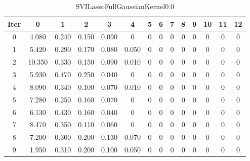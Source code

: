\begin{table}
	\begin{center}
		\begin{tabular}{|c|c|c|c|c|c|c|c|c|c|c|c|c|c|}
			\hline
			Iter & 0 & 1 & 2 & 3 & 4 & 5 & 6 & 7 & 8 & 9 & 10 & 11 & 12 \\
			\hline
			0 & 4.080 & 0.240 & 0.150 & 0.090 & 0 & 0 & 0 & 0 & 0 & 0 & 0 & 0 & 0 \\
			\hline
			1 & 5.420 & 0.290 & 0.170 & 0.080 & 0.050 & 0 & 0 & 0 & 0 & 0 & 0 & 0 & 0 \\
			\hline
			2 & 10.350 & 0.330 & 0.150 & 0.090 & 0.010 & 0 & 0 & 0 & 0 & 0 & 0 & 0 & 0 \\
			\hline
			3 & 5.930 & 0.470 & 0.250 & 0.040 & 0 & 0 & 0 & 0 & 0 & 0 & 0 & 0 & 0 \\
			\hline
			4 & 8.090 & 0.340 & 0.100 & 0.070 & 0.010 & 0 & 0 & 0 & 0 & 0 & 0 & 0 & 0 \\
			\hline
			5 & 7.280 & 0.250 & 0.160 & 0.070 & 0 & 0 & 0 & 0 & 0 & 0 & 0 & 0 & 0 \\
			\hline
			6 & 6.130 & 0.430 & 0.160 & 0.040 & 0 & 0 & 0 & 0 & 0 & 0 & 0 & 0 & 0 \\
			\hline
			7 & 8.470 & 0.350 & 0.110 & 0.060 & 0 & 0 & 0 & 0 & 0 & 0 & 0 & 0 & 0 \\
			\hline
			8 & 7.200 & 0.300 & 0.200 & 0.130 & 0.070 & 0 & 0 & 0 & 0 & 0 & 0 & 0 & 0 \\
			\hline
			9 & 1.950 & 0.310 & 0.200 & 0.100 & 0.050 & 0 & 0 & 0 & 0 & 0 & 0 & 0 & 0 \\
			\hline
		\end{tabular}
	\end{center}
	\caption{SVILassoFullGaussianKernel0.0}
\end{table}